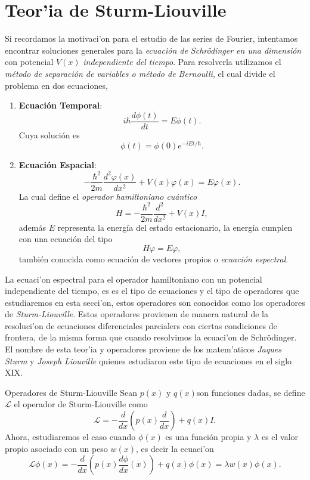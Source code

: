 \documentclass[main.tex]{subfiles}
\begin{document}
\chapter{Teor'ia de Sturm-Liouville}\label{cap3}
\noindent Si recordamos la motivaci'on para el estudio de las series de Fourier, intentamos encontrar soluciones generales para la \emph{ecuación de Schrödinger en una dimensión} con potencial \(V(x)\) \emph{independiente del tiempo}. Para resolverla utilizamos el \emph{método de separación de variables o método de Bernoulli}, el cual divide el problema en dos ecuaciones,

\begin{enumerate}
    \item \textbf{Ecuación Temporal}:
    \[
    i\hbar \dfrac{d \phi(t)}{dt} = E \phi(t).
    \]
    Cuya solución es
    \[
    \phi(t) = \phi(0) e^{-iEt/\hbar}.
    \]

    \item \textbf{Ecuación Espacial}:
    \[
    -\frac{\hbar^2}{2m} \dfrac{d^2 \varphi(x)}{dx^2} + V(x) \varphi(x) = E \varphi(x).
    \]
    La cual define el \emph{operador hamiltoniano cuántico}
    \[
    H =-\frac{\hbar^2}{2m} \dfrac{d^2 }{dx^2} + V(x)I,
    \]
    además \(E\) representa la energía del estado estacionario, la energía cumplen con una ecuación del tipo
    \[
    H\varphi=E\varphi,
    \]
    también conocida como ecuación de vectores propios o \emph{ecuación espectral}.
\end{enumerate}
La ecuaci'on  espectral para el operador hamiltoniano con un potencial independiente del tiempo, es es el tipo de ecuaciones y el tipo de operadores que estudiaremos en esta secci'on, estos operadores son conocidos como los operadores de \emph{Sturm-Liouville}. Estos operadores provienen de manera natural de la resoluci'on de ecuaciones diferenciales parcialers con ciertas condiciones de frontera, de la misma forma que cuando resolvimos la ecuaci'on de Schrödinger. El nombre de esta teor'ia y operadores proviene de los matem'aticos \emph{Jaques Sturm} y \emph{Joseph Liouville} quienes estudiaron este tipo de ecuaciones en el siglo XIX.

\begin{def.}{Operadores de Sturm-Liouville}
  Sean \(p(x)\) y \(q(x)\)son funciones dadas, se define \(\mathcal{L}\) el operador de Sturm-Liouville como
  \[
    \mathcal{L}= -\frac{d}{dx} \left( p(x) \dfrac{d}{dx} \right) + q(x)I.
  \]
  Ahora, estudiaremos el caso cuando \(\phi(x)\) es una función propia y \(\lambda\) es el valor propio asociado con un peso \(w(x)\), es decir la ecuaci'on
  \[
    \mathcal{L}\phi(x)= -\frac{d}{dx}\left( p(x) \dfrac{d\phi}{dx}(x)\right) + q(x)\phi(x)=\lambda w(x)\phi(x).
  \]
\end{def.}
\end{document}
